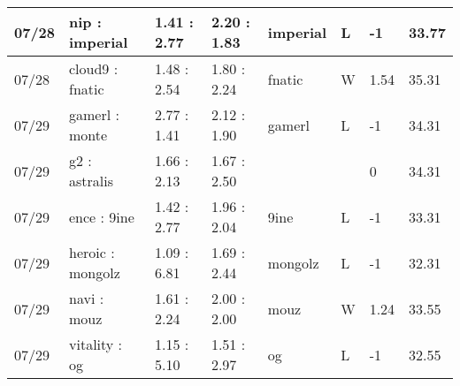 \begin{small}
\begin{longtable}{|l|l|l|l|l|l|l|l|}
	07/28                               & nip : imperial                      & 1.41 : 2.77                             & 2.20 : 1.83                             & imperial                          & L                                 & -1                                   & 33.77                             \\ \hline
	07/28                               & cloud9 : fnatic                     & 1.48 : 2.54                             & 1.80 : 2.24                             & fnatic                            & W                                 & 1.54                                 & 35.31                             \\ \hline
	07/29                               & gamerl : monte                      & 2.77 : 1.41                             & 2.12 : 1.90                             & gamerl                            & L                                 & -1                                   & 34.31                             \\ \hline
	07/29                               & g2 : astralis                       & 1.66 : 2.13                             & 1.67 : 2.50                             &                                   &                                   & 0                                    & 34.31                             \\ \hline
	07/29                               & ence : 9ine                         & 1.42 : 2.77                             & 1.96 : 2.04                             & 9ine                              & L                                 & -1                                   & 33.31                             \\ \hline
	07/29                               & heroic : mongolz                    & 1.09 : 6.81                             & 1.69 : 2.44                             & mongolz                           & L                                 & -1                                   & 32.31                             \\ \hline
	07/29                               & navi : mouz                         & 1.61 : 2.24                             & 2.00 : 2.00                             & mouz                              & W                                 & 1.24                                 & 33.55                             \\ \hline
	07/29                               & vitality : og                       & 1.15 : 5.10                             & 1.51 : 2.97                             & og                                & L                                 & -1                                   & 32.55                             \\ \hline

\end{longtable}
\end{small}
